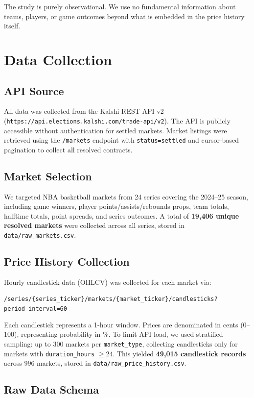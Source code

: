 \documentclass[11pt, a4paper]{article}
\begin{document}
The study is purely observational. We use no fundamental information about teams, players, or game outcomes beyond what is embedded in the price history itself.

\section{Data Collection}

\subsection{API Source}
All data was collected from the Kalshi REST API v2 (\texttt{https://api.elections.kalshi.com/trade-api/v2}). The API is publicly accessible without authentication for settled markets. Market listings were retrieved using the \texttt{/markets} endpoint with \texttt{status=settled} and cursor-based pagination to collect all resolved contracts.

\subsection{Market Selection}
We targeted NBA basketball markets from 24 series covering the 2024--25 season, including game winners, player points/assists/rebounds props, team totals, halftime totals, point spreads, and series outcomes. A total of \textbf{19,406 unique resolved markets} were collected across all series, stored in \texttt{data/raw\_markets.csv}.

\subsection{Price History Collection}
Hourly candlestick data (OHLCV) was collected for each market via:
\begin{center}
\texttt{/series/\{series\_ticker\}/markets/\{market\_ticker\}/candlesticks?period\_interval=60}
\end{center}
Each candlestick represents a 1-hour window. Prices are denominated in cents (0--100), representing probability in \%. To limit API load, we used stratified sampling: up to 300 markets per \texttt{market\_type}, collecting candlesticks only for markets with \texttt{duration\_hours} $\geq 24$. This yielded \textbf{49,015 candlestick records} across 996 markets, stored in \texttt{data/raw\_price\_history.csv}.

\subsection{Raw Data Schema}
\end{document}
